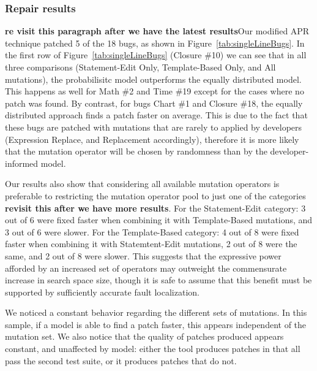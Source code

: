 \documentclass[conference]{IEEEtran}
\newcommand{\todo}[1]
  {{\scriptsize \textbf{\color{red} {#1}}}}
\begin{document}
\subsubsection{Repair results}   \label{repResults}
\todo{re visit this paragraph after we have the latest results}Our modified APR technique patched 5 of the 18 bugs, as shown in 
Figure~\ref{tab:singleLineBugs}. In the first row of Figure~\ref{tab:singleLineBugs} (Closure \#10) we can see
that in all three comparisons (Statement-Edit Only, Template-Based Only, and All
mutations), the probabilisitc model outperforms
the equally distributed model. This happens as well for
Math \#2 and Time \#19 except for the cases where no patch was
found. By contrast, for bugs Chart \#1 and Closure \#18, the equally
distributed approach finds a patch faster on average. This is due to the fact
that these bugs are patched with mutations that are rarely to applied by developers (Expression Replace, and Replacement accordingly),
therefore it is more likely that the mutation operator will be chosen by randomness
than by the developer-informed model.

Our results also show that considering all available mutation operators is
preferable to 
restricting the mutation operator pool to just one of the categories \todo{revisit this after we have more results}. For the
Statement-Edit category: 3 out of 6 were fixed faster when combining it with
Template-Based mutations, and 3 out of 6 were slower. For the Template-Based
category: 4 out of 8 were fixed faster when combining it with Statemtent-Edit
mutations, 2 out of 8 were the same, and 2 out of 8 were slower. This suggests
that the expressive power afforded by an increased set of operators may
outweight the commensurate increase in search space size, though it is safe to
assume that this benefit must be supported by sufficiently accurate fault
localization. 

We noticed a
constant behavior regarding the different sets of mutations. In this sample, if
a model is able to find a patch faster, this appears independent of the mutation
set.  We also notice that
the quality of patches produced  appears constant, and unaffected by model:
either the tool produces patches in 
that all pass the second test suite, or it produces patches that do not. 
\end{document}
